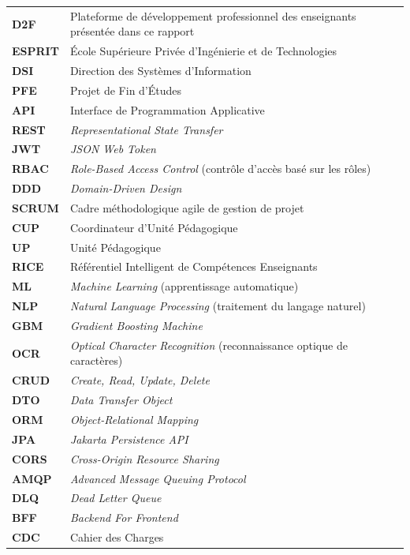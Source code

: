 \documentclass[12pt,a4paper]{report}
\begin{document}
{\small\renewcommand{\arraystretch}{1.15}
\begin{longtable}{p{3.2cm} p{11cm}}
\textbf{D2F}    & Plateforme de développement professionnel des enseignants présentée dans ce rapport \\
\textbf{ESPRIT} & École Supérieure Privée d'Ingénierie et de Technologies \\
\textbf{DSI}    & Direction des Systèmes d'Information \\
\textbf{PFE}    & Projet de Fin d'Études \\
\textbf{API}    & Interface de Programmation Applicative \\
\textbf{REST}   & \textit{Representational State Transfer} \\
\textbf{JWT}    & \textit{JSON Web Token} \\
\textbf{RBAC}   & \textit{Role-Based Access Control} (contrôle d'accès basé sur les rôles) \\
\textbf{DDD}    & \textit{Domain-Driven Design} \\
\textbf{SCRUM}  & Cadre méthodologique agile de gestion de projet \\
\textbf{CUP}    & Coordinateur d'Unité Pédagogique \\
\textbf{UP}     & Unité Pédagogique \\
\textbf{RICE}   & Référentiel Intelligent de Compétences Enseignants \\
\textbf{ML}     & \textit{Machine Learning} (apprentissage automatique) \\
\textbf{NLP}    & \textit{Natural Language Processing} (traitement du langage naturel) \\
\textbf{GBM}    & \textit{Gradient Boosting Machine} \\
\textbf{OCR}    & \textit{Optical Character Recognition} (reconnaissance optique de caractères) \\
\textbf{CRUD}   & \textit{Create, Read, Update, Delete} \\
\textbf{DTO}    & \textit{Data Transfer Object} \\
\textbf{ORM}    & \textit{Object-Relational Mapping} \\
\textbf{JPA}    & \textit{Jakarta Persistence API} \\
\textbf{CORS}   & \textit{Cross-Origin Resource Sharing} \\
\textbf{AMQP}   & \textit{Advanced Message Queuing Protocol} \\
\textbf{DLQ}    & \textit{Dead Letter Queue} \\
\textbf{BFF}    & \textit{Backend For Frontend} \\
\textbf{CDC}    & Cahier des Charges \\

\end{longtable}}
\end{document}
